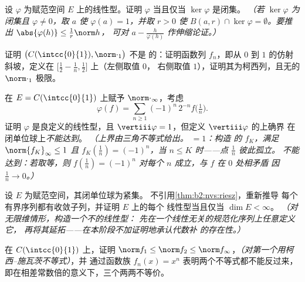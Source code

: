 \begin{exercise}[$\star\star$]\label{exo:b2:nvs:6}
设 $\varphi$ 为赋范空间 $E$ 上的线性型。证明
$\varphi$ 当且仅当 $\ker\varphi$ 是闭集。
\emph{（若 $\ker\varphi$ 为闭集且 $\varphi \neq 0$，取 $a$
使 $\varphi(a) = 1$，并取 $r > 0$ 使 $B(a, r) \cap \ker\varphi =
\emptyset$。要推出 $\abs{\varphi(h)} \leq \frac{1}{r}\norm h$，
可对 $a - \frac{h}{\varphi(h)}$ 作伸缩论证。）}
\end{exercise}

\begin{exercise}[$\star\star$]\label{exo:b2:nvs:7}
证明 $\bigl(C(\intcc{0}{1}), \norm\cdot_1\bigr)$ 不是
的：证明函数列 $f_n$，即从 $0$ 到
$1$ 的仿射斜坡，定义在 $\bigl[\frac12 - \frac1n, \frac12\bigr]$ 上（左侧取值 $0$，
右侧取值 $1$），证明其为柯西列，且无的
$\norm\cdot_1$ 极限。
\end{exercise}

\begin{exercise}[$\star\star\star$]\label{exo:b2:nvs:8}
在 $E = C(\intcc{0}{1})$ 上赋予 $\norm\cdot_\infty$，考虑
\[
\varphi(f) = \sum_{n \geq 1} (-1)^n\, 2^{-n} f\bigl(\tfrac1n\bigr).
\]
证明 $\varphi$ 是良定义的线性型，且
$\vertiii\varphi = 1$，但定义 $\vertiii\varphi$ 的上确界
在闭单位球上\emph{不能达到}。
\emph{（上界由三角不等式给出。 $= 1$：构造
的 $f_K$，满足 $\norm{f_K}_\infty \leq 1$ 且 $f_K(\frac1n)
= (-1)^n$，当 $n \leq K$ 时——点 $\frac1n$ 彼此孤立。
不能达到：若取等，则 $f(\frac1n) =
(-1)^n$ 对每个 $n$ 成立，与 $f$ 在 $0$ 处相矛盾
因 $\frac1n \to 0$。）}
\end{exercise}

\begin{exercise}[$\star\star\star$]\label{exo:b2:nvs:9}
设 $E$ 为赋范空间，其闭单位球为紧集。
不引用\cref{thm:b2:nvs:riesz}，重新推导
每个有界序列都有收敛子列，并证明 $E$ 上的每个
线性型当且仅当 $\dim E < \infty$。
\emph{（对无限维情形，构造一个不的线性型：
先在一个线性无关的规范化序列上任意定义它，
再将其延拓——在本阶段不加证明地承认代数补
的存在性。）}
\end{exercise}

\begin{exercise}[$\star\star$]\label{exo:b2:nvs:10}
在 $C(\intcc{0}{1})$ 上，证明 $\norm f_1 \leq \norm f_2 \leq \norm
f_\infty$，\emph{（对第一个用柯西--施瓦茨不等式）}，并
通过函数族 $f_n(x) = x^n$ 表明两个不等式都不能反过来，
即在相差常数倍的意义下，三个两两不等价。
\end{exercise}

